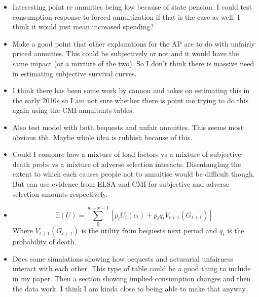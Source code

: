 \documentclass[12pt]{article}
\begin{document}
\begin{itemize}
      \item Interesting point re annuities being low because of state pension.
            I could test consumption response to forced annuitization if that is the
            case as well. I think it would just mean increased spending?

      \item Make a good point that other explanations for the AP are to do with unfairly priced
            annuities. This could be subjectively or not and it would have the same impact (or
            a mixture of the two). So I don't think there is massive need in estimating subjective
            survival curves.

      \item I think there has been some work by cannon and tokes on estimating this in the
            early 2010s so I am not sure whether there is point me trying to do this again using the
            CMI annuitants tables.

      \item Also test model with both bequests and unfair annuities. This seems most obvious tbh.
            Maybe whole idea is rubbish because of this.

      \item Could I compare how a mixture of load factors vs a mixture of subjective death probs
            vs a mixture of adverse selection interacts. Disentangling the extent to which each causes
            people not to annuitise would be difficult though. But can use evidence from ELSA and CMI for
            subjective and adverse selection amounts respectively.

      \item \begin{equation*}
                  \mathbb{E}(U) = \sum_{0}^{w - x - 1}[p_{t}U_{t}(c_{t}) + p_{t}q_{t}V_{t+1}(G_{t+1})]
            \end{equation*}
            Where $V_{t+1}(G_{t+1})$ is the utility from bequests next period and $q_{t}$ is the probability of death.


      \item Does some simulations showing how bequests and acturarial unfairness interact with each other.
            This type of table could be a good thing to include in my paper. Then a section showing implied consumption
            changes and then the data work. I think I am kinda close to being able to make that anyway.


\end{itemize}
\end{document}
